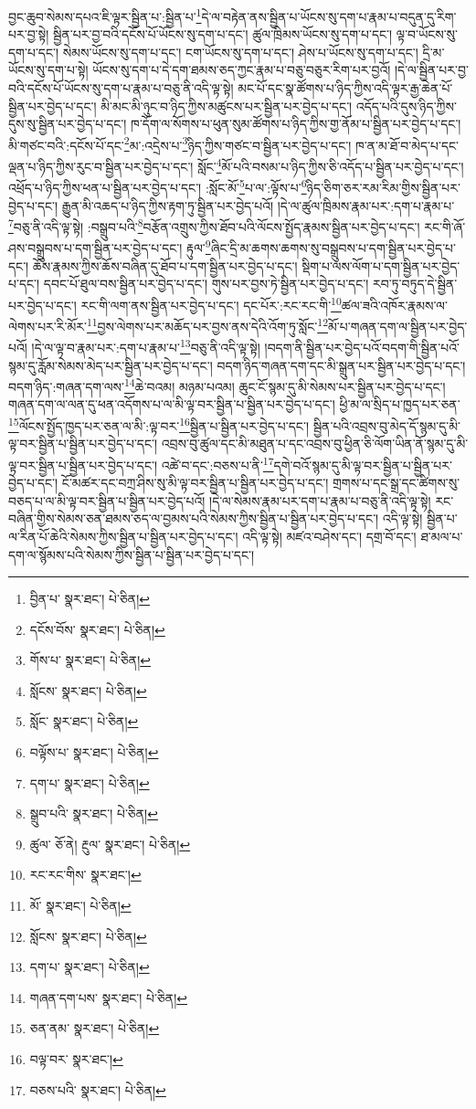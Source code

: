 བྱང་ཆུབ་སེམས་དཔའ་ཇི་ལྟར་སྦྱིན་པ་:སྦྱིན་པ་\footnote{བྱིན་པ་  སྣར་ཐང་།  པེ་ཅིན། }དེ་ལ་བརྟེན་ནས་སྦྱིན་པ་ཡོངས་སུ་དག་པ་རྣམ་པ་བདུན་དུ་རིག་པར་བྱ་སྟེ། སྦྱིན་པར་བྱ་བའི་དངོས་པོ་ཡོངས་སུ་དག་པ་དང་། ཚུལ་ཁྲིམས་ཡོངས་སུ་དག་པ་དང་། ལྟ་བ་ཡོངས་སུ་དག་པ་དང་། སེམས་ཡོངས་སུ་དག་པ་དང་། ངག་ཡོངས་སུ་དག་པ་དང་། ཤེས་པ་ཡོངས་སུ་དག་པ་དང་། དྲི་མ་ཡོངས་སུ་དག་པ་སྟེ། ཡོངས་སུ་དག་པ་དེ་དག་ཐམས་ཅད་ཀྱང་རྣམ་པ་བཅུ་བཅུར་རིག་པར་བྱའོ། །དེ་ལ་སྦྱིན་པར་བྱ་བའི་དངོས་པོ་ཡོངས་སུ་དག་པ་རྣམ་པ་བཅུ་ནི་འདི་ལྟ་སྟེ། མང་པོ་དང་སྣ་ཚོགས་པ་ཉིད་ཀྱིས་འདི་ལྟར་རྒྱ་ཆེན་པོ་སྦྱིན་པར་བྱེད་པ་དང་། མི་མང་མི་ཉུང་བ་ཉིད་ཀྱིས་མཚུངས་པར་སྦྱིན་པར་བྱེད་པ་དང་། འདོད་པའི་དུས་ཉིད་ཀྱིས་དུས་སུ་སྦྱིན་པར་བྱེད་པ་དང་། ཁ་དོག་ལ་སོགས་པ་ཕུན་སུམ་ཚོགས་པ་ཉིད་ཀྱིས་གྱ་ནོམ་པ་སྦྱིན་པར་བྱེད་པ་དང་། མི་གཙང་བའི་:དངོས་པོ་དང་\footnote{དངོས་བོས་  སྣར་ཐང་།  པེ་ཅིན། }མ་:འདྲེས་པ་\footnote{གོས་པ་  སྣར་ཐང་།  པེ་ཅིན། }ཉིད་ཀྱིས་གཙང་བ་སྦྱིན་པར་བྱེད་པ་དང་། ཁ་ན་མ་ཐོ་བ་མེད་པ་དང་ལྡན་པ་ཉིད་ཀྱིས་རུང་བ་སྦྱིན་པར་བྱེད་པ་དང་། སློང་\footnote{སློངས་  སྣར་ཐང་།  པེ་ཅིན། }མོ་པའི་བསམ་པ་ཉིད་ཀྱིས་ཅི་འདོད་པ་སྦྱིན་པར་བྱེད་པ་དང་། འཕྲོད་པ་ཉིད་ཀྱིས་ཕན་པ་སྦྱིན་པར་བྱེད་པ་དང་། :སློང་མོ་\footnote{སློང་  སྣར་ཐང་།  པེ་ཅིན། }པ་ལ་:ལྟོས་པ་\footnote{བལྟོས་པ་  སྣར་ཐང་།  པེ་ཅིན། }ཉིད་ཅིག་ཅར་རམ་རིམ་གྱིས་སྦྱིན་པར་བྱེད་པ་དང་། རྒྱུན་མི་འཆད་པ་ཉིད་ཀྱིས་རྟག་ཏུ་སྦྱིན་པར་བྱེད་པའོ། །དེ་ལ་ཚུལ་ཁྲིམས་རྣམ་པར་:དག་པ་རྣམ་པ་\footnote{དག་པ་  སྣར་ཐང་།  པེ་ཅིན། }བཅུ་ནི་འདི་ལྟ་སྟེ། :བསྒྲུབ་པའི་\footnote{སྒྲུབ་པའི་  སྣར་ཐང་།  པེ་ཅིན། }བརྩོན་འགྲུས་ཀྱིས་ཐོབ་པའི་ལོངས་སྤྱོད་རྣམས་སྦྱིན་པར་བྱེད་པ་དང་། རང་གི་ཞོ་ཤས་བསྒྲུབས་པ་དག་སྦྱིན་པར་བྱེད་པ་དང་། རྟུལ་\footnote{ཚུལ་  ཅོ་ནེ། རྔུལ་  སྣར་ཐང་།  པེ་ཅིན། }ཞིང་དྲི་མ་ཆགས་ཆགས་སུ་བསྒྲུབས་པ་དག་སྦྱིན་པར་བྱེད་པ་དང་། ཆོས་རྣམས་ཀྱིས་ཆོས་བཞིན་དུ་ཐོབ་པ་དག་སྦྱིན་པར་བྱེད་པ་དང་། སྡིག་པ་ལས་ལོག་པ་དག་སྦྱིན་པར་བྱེད་པ་དང་། དབང་པོ་ཐུལ་བས་སྦྱིན་པར་བྱེད་པ་དང་། གུས་པར་བྱས་ཏེ་སྦྱིན་པར་བྱེད་པ་དང་། རབ་ཏུ་བཏུད་དེ་སྦྱིན་པར་བྱེད་པ་དང་། རང་གི་ལག་ནས་སྦྱིན་པར་བྱེད་པ་དང་། དང་པོར་:རང་རང་གི་\footnote{རང་རང་གིས་  སྣར་ཐང་། }ཚལ་ཟའི་འཁོར་རྣམས་ལ་ལེགས་པར་རི་མོར་\footnote{མོ་  སྣར་ཐང་།  པེ་ཅིན། }བྱས་ལེགས་པར་མཆོད་པར་བྱས་ནས་དེའི་འོག་ཏུ་སློང་\footnote{སློངས་  སྣར་ཐང་།  པེ་ཅིན། }མོ་པ་གཞན་དག་ལ་སྦྱིན་པར་བྱེད་པའོ། །དེ་ལ་ལྟ་བ་རྣམ་པར་:དག་པ་རྣམ་པ་\footnote{དག་པ་  སྣར་ཐང་།  པེ་ཅིན། }བཅུ་ནི་འདི་ལྟ་སྟེ། །བདག་ནི་སྦྱིན་པར་བྱེད་པའོ་བདག་གི་སྦྱིན་པའོ་སྙམ་དུ་རློམ་སེམས་མེད་པར་སྦྱིན་པར་བྱེད་པ་དང་། བདག་ཉིད་གཞན་དག་དང་མི་སྒྲུན་པར་སྦྱིན་པར་བྱེད་པ་དང་། བདག་ཉིད་:གཞན་དག་ལས་\footnote{གཞན་དག་པས་  སྣར་ཐང་།  པེ་ཅིན། }ཆེ་བའམ། མཉམ་པའམ། ཆུང་ངོ་སྙམ་དུ་མི་སེམས་པར་སྦྱིན་པར་བྱེད་པ་དང་། གཞན་དག་ལ་ལན་དུ་ཕན་འདོགས་པ་ལ་མི་ལྟ་བར་སྦྱིན་པ་སྦྱིན་པར་བྱེད་པ་དང་། ཕྱི་མ་ལ་སྲིད་པ་ཁྱད་པར་ཅན་\footnote{ཅན་ནམ་  སྣར་ཐང་།  པེ་ཅིན། }ལོངས་སྤྱོད་ཁྱད་པར་ཅན་ལ་མི་:ལྟ་བར་\footnote{བལྟ་བར་  སྣར་ཐང་། }སྦྱིན་པ་སྦྱིན་པར་བྱེད་པ་དང་། སྦྱིན་པའི་འབྲས་བུ་མེད་དོ་སྙམ་དུ་མི་ལྟ་བར་སྦྱིན་པ་སྦྱིན་པར་བྱེད་པ་དང་། འབྲས་བུ་ཚུལ་དང་མི་མཐུན་པ་དང་འབྲས་བུ་ཕྱིན་ཅི་ལོག་ཡིན་ནོ་སྙམ་དུ་མི་ལྟ་བར་སྦྱིན་པ་སྦྱིན་པར་བྱེད་པ་དང་། འཚེ་བ་དང་:བཅས་པ་ནི་\footnote{བཅས་པའི་  སྣར་ཐང་།  པེ་ཅིན། }དགེ་བའོ་སྙམ་དུ་མི་ལྟ་བར་སྦྱིན་པ་སྦྱིན་པར་བྱེད་པ་དང་། ངོ་མཚར་དང་བཀྲ་ཤིས་སུ་མི་ལྟ་བར་སྦྱིན་པ་སྦྱིན་པར་བྱེད་པ་དང་། གྲགས་པ་དང་སྒྲ་དང་ཚིགས་སུ་བཅད་པ་ལ་མི་ལྟ་བར་སྦྱིན་པ་སྦྱིན་པར་བྱེད་པའོ། །དེ་ལ་སེམས་རྣམ་པར་དག་པ་རྣམ་པ་བཅུ་ནི་འདི་ལྟ་སྟེ། རང་བཞིན་གྱིས་སེམས་ཅན་ཐམས་ཅད་ལ་བྱམས་པའི་སེམས་ཀྱིས་སྦྱིན་པ་སྦྱིན་པར་བྱེད་པ་དང་། འདི་ལྟ་སྟེ། སྦྱིན་པ་ལ་རིན་པོ་ཆེའི་སེམས་ཀྱིས་སྦྱིན་པ་སྦྱིན་པར་བྱེད་པ་དང་། འདི་ལྟ་སྟེ། མཛའ་བཤེས་དང་། དགྲ་བོ་དང་། ཐ་མལ་པ་དག་ལ་སྙོམས་པའི་སེམས་ཀྱིས་སྦྱིན་པ་སྦྱིན་པར་བྱེད་པ་དང་། 